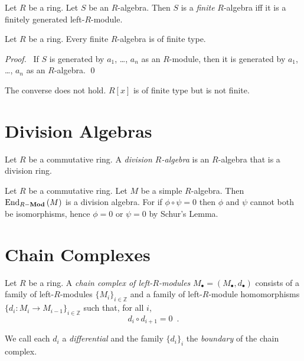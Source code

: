 \begin{df}
Let $R$ be a ring. Let $S$ be an $R$-algebra. Then $S$ is a \emph{finite} $R$-algebra iff it is a finitely generated left-$R$-module.
\end{df}

\begin{prop}
Let $R$ be a ring. Every finite $R$-algebra is of finite type.
\end{prop}

\begin{proof}
\pf\ If $S$ is generated by $a_1$, \ldots, $a_n$ as an $R$-module, then it is generated by $a_1$, \ldots, $a_n$ as an $R$-algebra. \qed
\end{proof}

\begin{ex}
The converse does not hold. $R[x]$ is of finite type but is not finite.
\end{ex}

\chapter{Division Algebras}

\begin{df}
Let $R$ be a commutative ring.
A \emph{division $R$-algebra} is an $R$-algebra that is a division ring.
\end{df}

\begin{ex}
Let $R$ be a commutative ring. Let $M$ be a simple $R$-algebra. Then $\mathrm{End}_{{R}-\mathbf{Mod}} \left( {M} \right)$ is a division algebra. For if $\phi \circ \psi = 0$ then $\phi$ and $\psi$ cannot both be isomorphisms, hence $\phi = 0$ or $\psi = 0$ by Schur's Lemma.
\end{ex}

\chapter{Chain Complexes}

\begin{df}
Let $R$ be a ring. A \emph{chain complex of left-$R$-modules} $M_\bullet = (M_\bullet, d_\bullet)$ consists of a family of left-$R$-modules $\{ M_i \}_{i \in \mathbb{Z}}$ and a family of left-$R$-module homomorphisms $\{ d_i : M_i \rightarrow M_{i-1} \}_{i \in \mathbb{Z}}$ such that, for all $i$,
\[ d_i \circ d_{i+1} = 0 \enspace . \]

We call each $d_i$ a \emph{differential} and the family $\{d_i\}_i$ the \emph{boundary} of the chain complex.
\end{df}


